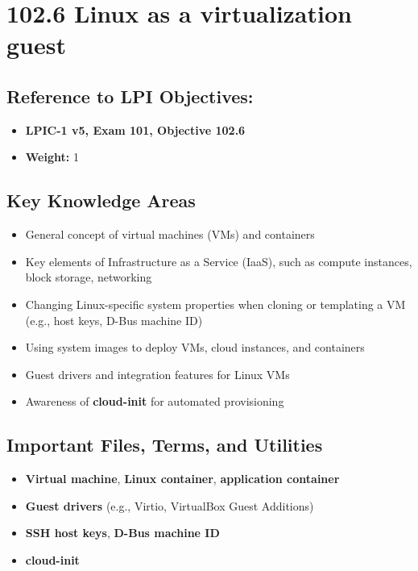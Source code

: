 \documentclass[a4paper]{report}
\begin{document}
\section*{102.6 Linux as a virtualization guest}



\subsection*{Reference to LPI Objectives:}
\begin{itemize}
    \item \textbf{LPIC-1 v5, Exam 101, Objective 102.6}
    \item \textbf{Weight:} 1
\end{itemize}

\subsection*{Key Knowledge Areas}
\begin{itemize}
    \item General concept of virtual machines (VMs) and containers
    \item Key elements of Infrastructure as a Service (IaaS), such as compute instances, block storage, networking
    \item Changing Linux-specific system properties when cloning or templating a VM (e.g., host keys, D-Bus machine ID)
    \item Using system images to deploy VMs, cloud instances, and containers
    \item Guest drivers and integration features for Linux VMs
    \item Awareness of \textbf{cloud-init} for automated provisioning
\end{itemize}

\subsection*{Important Files, Terms, and Utilities}
\begin{itemize}
    \item \textbf{Virtual machine}, \textbf{Linux container}, \textbf{application container}
    \item \textbf{Guest drivers} (e.g., Virtio, VirtualBox Guest Additions)
    \item \textbf{SSH host keys}, \textbf{D-Bus machine ID}
    \item \textbf{cloud-init}
\end{itemize}
\end{document}
